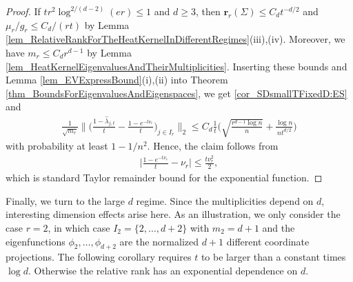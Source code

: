\documentclass[a4paper,11pt]{article} %
\numberwithin{equation}{section}
\theoremstyle{definition}
\theoremstyle{remark}
\theoremstyle{plain}
\begin{document}
\begin{proof}
  If \( t r^{2} \log^{2/(d - 2)}(e r) \le 1 \) and $d\geq 3$, then $\mathbf{r}_r(\Sigma)\leq C_dt^{-d/2}$ and $\mu_r/g_r\leq C_d/(rt)$ by Lemma \ref{lem_RelativeRankForTheHeatKernelInDifferentRegimes}(iii),(iv). Moreover, we have $m_r\leq C_dr^{d-1}$ by Lemma \ref{lem_HeatKernelEigenvaluesAndTheirMultiplicities}. Inserting these bounds and Lemma \ref{lem_EVExpressBound}(i),(ii) into Theorem \ref{thm_BoundsForEigenvaluesAndEigenspaces}, we get \eqref{cor_SDsmallTFixedD:ES} and 
  \begin{align}
      \frac{1}{\sqrt{m_{r}}} 
        \Big\| \Big( \frac{1 - \widehat{\lambda}_{j, t}}{t} -  \frac{1 - e^{-t\nu_r}}{t}\Big)_{j \in I_{r}} 
        \Big\|_{2}
  \le C_d\frac{1}{t}\Big( \sqrt{\frac{r^{d-1}\log n}{n}} 
            + \frac{\log n}{nt^{d/2}}\Big)
  \end{align}
  with probability at least \( 1 - 1/n^2\). 
  Hence, the claim follows from
  \begin{align}
      \Big|\frac{1 - e^{-t\nu_r}}{t} -\nu_r\Big|\leq \frac{t\nu_r^2}{2},
  \end{align}
  which is standard Taylor remainder bound for the exponential function.
\end{proof}

Finally, we turn to the large \( d \) regime. Since the multiplicities depend on $d$, interesting dimension effects arise here. As an illustration, we only consider the case \( r = 2 \), in which case $I_2=\{2,\dots,d+2\}$ with $m_2=d+1$ and the eigenfunctions $\phi_2,\dots,\phi_{d+2}$ are the normalized $d+1$ different coordinate projections. The following corollary requires $t$ to be larger than a constant times $\log d$. Otherwise the relative rank has an exponential dependence on $d$.
\end{document}
